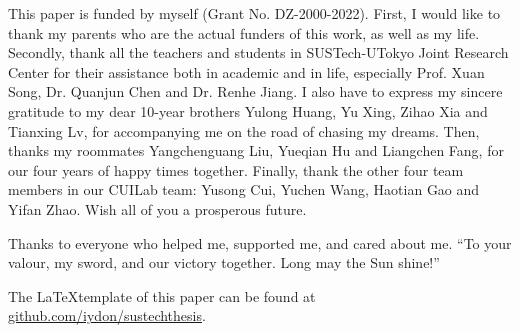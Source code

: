 
This paper is funded by myself (Grant No. DZ-2000-2022). First, I would like to thank my parents who are the actual funders of this work, as well as my life. Secondly, thank all the teachers and students in SUSTech-UTokyo Joint Research Center for their assistance both in academic and in life, especially Prof. Xuan Song, Dr. Quanjun Chen and Dr. Renhe Jiang. I also have to express my sincere gratitude to my dear 10-year brothers Yulong Huang, Yu Xing, Zihao Xia and Tianxing Lv, for accompanying me on the road of chasing my dreams. Then, thanks my roommates Yangchenguang Liu, Yueqian Hu and Liangchen Fang, for our four years of happy times together. Finally, thank the other four team members in our CUILab team: Yusong Cui, Yuchen Wang, Haotian Gao and Yifan Zhao. Wish all of you a prosperous future.

Thanks to everyone who helped me, supported me, and cared about me. ``To your valour, my sword, and our victory together. Long may the Sun shine!''

\vspace{\baselineskip}

The \LaTeX template of this paper can be found at \href{https://github.com/iydon/sustechthesis}{github.com/iydon/sustechthesis}.